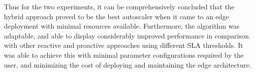 Thus for the two experiments, it can be comprehensively concluded that the hybrid approach proved to be the best autoscaler when it came to an edge deployment with minimal resources available. Furthermore, the algorithm was adaptable, and able to display considerably improved performance in comparison with other reactive and proactive approaches using different SLA thresholds. It was able to achieve this with minimal parameter configurations required by the user, and minimizing the cost of deploying and maintaining the edge architecture.
